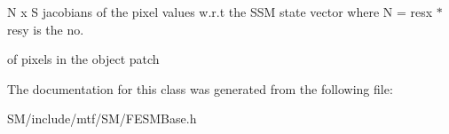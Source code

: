 N x S jacobians of the pixel values w.\-r.\-t the S\-S\-M state vector where N = resx $\ast$ resy is the no. 

of pixels in the object patch 

The documentation for this class was generated from the following file\-:\begin{DoxyCompactItemize}
\item 
S\-M/include/mtf/\-S\-M/F\-E\-S\-M\-Base.\-h\end{DoxyCompactItemize}
